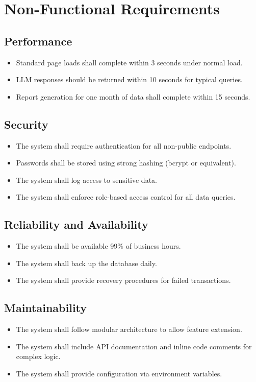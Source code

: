 \section{Non-Functional Requirements}
\subsection{Performance}
\begin{itemize}
    \item Standard page loads shall complete within 3 seconds under normal load.
    \item LLM responses should be returned within 10 seconds for typical queries.
    \item Report generation for one month of data shall complete within 15 seconds.
\end{itemize}

\subsection{Security}
\begin{itemize}
    \item The system shall require authentication for all non-public endpoints.
    \item Passwords shall be stored using strong hashing (bcrypt or equivalent).
    \item The system shall log access to sensitive data.
    \item The system shall enforce role-based access control for all data queries.
\end{itemize}

\subsection{Reliability and Availability}
\begin{itemize}
    \item The system shall be available 99\% of business hours.
    \item The system shall back up the database daily.
    \item The system shall provide recovery procedures for failed transactions.
\end{itemize}

\subsection{Maintainability}
\begin{itemize}
    \item The system shall follow modular architecture to allow feature extension.
    \item The system shall include API documentation and inline code comments for complex logic.
    \item The system shall provide configuration via environment variables.
\end{itemize}

